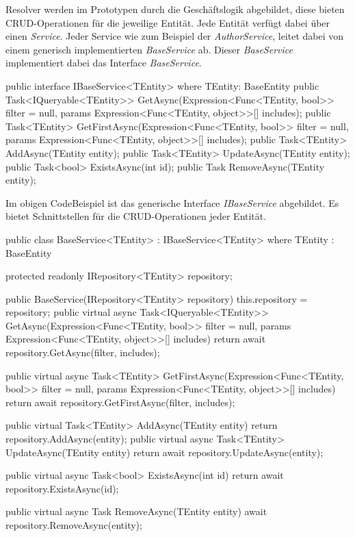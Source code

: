 Resolver werden im Prototypen durch die Geschäftslogik abgebildet, diese bieten CRUD-Operationen für die jeweilige Entität.
Jede Entität verfügt dabei über einen \textit{Service}.
Jeder Service wie zum Beispiel der \textit{AuthorService}, leitet dabei von einem generisch implementierten \textit{BaseService} ab.
Dieser \textit{BaseService} implementiert dabei das Interface \textit{BaseService}.
\newline

\begin{JsCode}
public interface IBaseService<TEntity> where TEntity: BaseEntity {
    public Task<IQueryable<TEntity>> GetAsync(Expression<Func<TEntity, bool>> filter = null, params Expression<Func<TEntity, object>>[] includes);
    public Task<TEntity> GetFirstAsync(Expression<Func<TEntity, bool>> filter = null, params Expression<Func<TEntity, object>>[] includes);
    public Task<TEntity> AddAsync(TEntity entity);
    public Task<TEntity> UpdateAsync(TEntity entity);
    public Task<bool> ExistsAsync(int id);
    public Task RemoveAsync(TEntity entity);
}
\end{JsCode}

Im obigen CodeBeispiel ist das generische Interface \textit{IBaseService} abgebildet.
Es bietet Schnittstellen für die CRUD-Operationen jeder Entität.

\begin{JsCode}
public class BaseService<TEntity> : IBaseService<TEntity> where TEntity : BaseEntity {
    protected readonly IRepository<TEntity> repository;

    public BaseService(IRepository<TEntity> repository) {
        this.repository = repository;
    }
    public virtual async Task<IQueryable<TEntity>> GetAsync(Expression<Func<TEntity, bool>> filter = null, params Expression<Func<TEntity, object>>[] includes) {
        return await repository.GetAsync(filter, includes);
    }

    public virtual async Task<TEntity> GetFirstAsync(Expression<Func<TEntity, bool>> filter = null, params Expression<Func<TEntity, object>>[] includes) {
        return await repository.GetFirstAsync(filter, includes);
    }

    public virtual Task<TEntity> AddAsync(TEntity entity) {
        return repository.AddAsync(entity);
    }
    public virtual async Task<TEntity> UpdateAsync(TEntity entity) {
        return await repository.UpdateAsync(entity);
    }

    public virtual async Task<bool> ExistsAsync(int id) {
        return await repository.ExistsAsync(id);
    }

    public virtual async Task RemoveAsync(TEntity entity) {
        await repository.RemoveAsync(entity);
    }
}
\end{JsCode}

